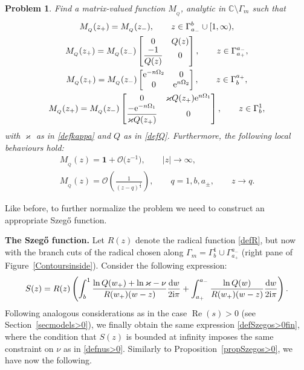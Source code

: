\documentclass[10pt,a4paper]{amsart}
\numberwithin{equation}{section}
\newtheorem{problem}[Theorem]{Problem}
\theoremstyle{definition}
\def\le{\left}
\def\ri{\right}
\def \d{{\mathrm d}}
\def\nn{\nonumber}
\def\be{\begin{equation}}
\def\ee{\end{equation}}
\def \1{\mathbf 1}
\def\C{{\mathbb C}}
\def \Re{\operatorname{Re} }
\begin{document}
\begin{problem}\label{RHPMQs<0}
Find a matrix-valued function $M_{_Q}$, analytic in $\C\setminus \Gamma_m$ such that
\begin{gather*}%
M_{_Q}(z_+) = M_{_Q}(z_-), \qquad z\in \Gamma_{a_-}^b\cup [1,\infty),\nn\\
M_{_Q}(z_+)= M_{_Q}(z_-) \begin{bmatrix}
0 & Q(z) \\
\displaystyle \frac{-1}{Q(z)} & 0
\end{bmatrix}, \qquad z\in \Gamma_{a_+}^{a_-},
\\
M_{_Q}(z_+)= M_{_Q}(z_-) \begin{bmatrix}
 {\rm e}^{-n\Omega_2} & 0\\
 0 & {\rm e}^{n\Omega_2}
\end{bmatrix},\qquad z\in \Gamma_b^{a_+},
\\
M_{_Q}(z_+)= M_{_Q}(z_-) \begin{bmatrix}
0 & \varkappa Q(z_+) {\rm e}^{n\Omega_1}\\
\displaystyle \frac{-{\rm e}^{-n\Omega_1}}{\varkappa Q(z_+)} & 0
\end{bmatrix}, \qquad z\in \Gamma_b^{1},
\end{gather*}
with $\varkappa$ as in \eqref{defkappa} and $Q$ as in \eqref{defQ}.
Furthermore, the following local behaviours hold:
\begin{gather*}
M_{_Q}(z) = \1 + \mathcal O\bigl(z^{-1}\bigr), \qquad |z|\to \infty,\\
M_{_Q}(z)= \mathcal O\le(\frac 1 {(z-q)^\frac 1 4}\ri), \qquad q= 1,b,a_\pm, \qquad z\to q.
\end{gather*}
\end{problem}

Like before, to further normalize the problem we need to construct an appropriate Szeg\H{o} function.

{\bf The Szeg\H{o} function.}
Let $R(z)$ denote the radical function \eqref{defR}, but now with the branch cuts of the radical chosen along $\Gamma_m = \Gamma_b^1\cup \Gamma_{a_+}^{a_-}$ (right pane of Figure~\ref{Contoursinside}).
Consider the following expression:
\be
\label{defSzegos<0}
S(z) = R(z) \le(
\int_b^1\frac{\ln Q(w_+) + \ln \varkappa-\nu}{R(w_+)(w-z)} \frac{\d w}{2{\rm i}\pi}
+
\int_{a_+}^{a_-}\frac{\ln Q(w)}{R(w_+)(w-z)} \frac{\d w}{2{\rm i}\pi}
 \ri).
\ee
Following analogous considerations as in the case $\Re (s)>0$ (see Section~\ref{secmodels>0}), we finally obtain the same expression \eqref{defSzegos>0fin},
where the condition that $S(z)$ is bounded at infinity imposes the same constraint on $\nu$ as in \eqref{defnus>0}.
Similarly to Proposition~\ref{propSzegos>0}, we have now the following.
\end{document}
